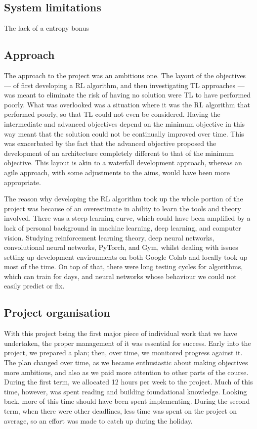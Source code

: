 \documentclass[12pt,a4paper]{article}
\begin{document}
\subsection{System limitations}
The lack of a entropy bonus 

\subsection{Approach}
The approach to the project was an ambitious one. The layout of the objectives --- of first developing a RL algorithm, and then investigating TL approaches --- was meant to eliminate the risk of having no solution were TL to have performed poorly. What was overlooked was a situation where it was the RL algorithm that performed poorly, so that TL could not even be considered. Having the intermediate and advanced objectives depend on the minimum objective in this way meant that the solution could not be continually improved over time. This was exacerbated by the fact that the advanced objective proposed the development of an architecture completely different to that of the minimum objective. This layout is akin to a waterfall development approach, whereas an agile approach, with some adjustments to the aims, would have been more appropriate. 

The reason why developing the RL algorithm took up the whole portion of the project was because of an overestimate in ability to learn the tools and theory involved. There was a steep learning curve, which could have been amplified by a lack of personal background in machine learning, deep learning, and computer vision. Studying reinforcement learning theory, deep neural networks, convolutional neural networks, PyTorch, and Gym, whilst dealing with issues setting up development environments on both Google Colab and locally took up most of the time. On top of that, there were long testing cycles for algorithms, which can train for days, and neural networks whose behaviour we could not easily predict or fix.

\subsection{Project organisation}
With this project being the first major piece of individual work that we have undertaken, the proper management of it was essential for success. Early into the project, we prepared a plan; then, over time, we monitored progress against it. The plan changed over time, as we became enthusiastic about making objectives more ambitious, and also as we paid more attention to other parts of the course. During the first term, we allocated 12 hours per week to the project. Much of this time, however, was spent reading and building foundational knowledge. Looking back, more of this time should have been spent implementing. During the second term, when there were other deadlines, less time was spent on the project on average, so an effort was made to catch up during the holiday. 
\end{document}
